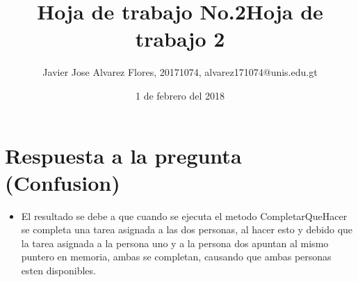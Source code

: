 \documentclass[12pt,a4paper]{article}
\author{Javier Jose Alvarez Flores, 20171074, alvarez171074@unis.edu.gt}
\title{Hoja de trabajo No.2}
\date{1 de febrero del 2018}
\begin{document}
\title{Hoja de trabajo 2}
\maketitle{}

\section{Respuesta a la pregunta (Confusion)}
\begin{itemize}

\item El resultado se debe a que cuando se ejecuta el metodo CompletarQueHacer se completa una tarea asignada a las dos personas, al hacer esto y debido que la tarea asignada a la persona uno y a la persona dos apuntan al mismo puntero en memoria, ambas se completan, causando que ambas personas esten disponibles.

\end{itemize}
\end{document}
